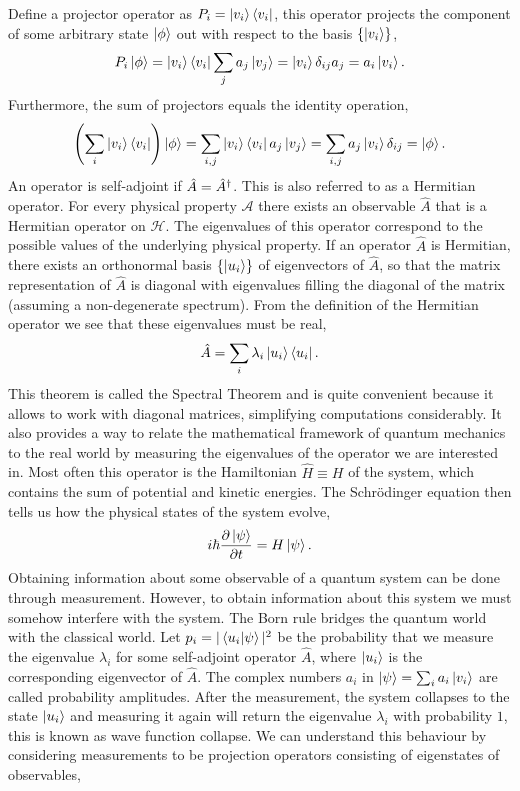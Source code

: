 \noindent Define a projector operator as $P_i = \ket{v_i}\bra{v_i}$, this operator projects the component of some arbitrary state $\ket{\phi}$ out with respect to the basis $\{\ket{v_i}\}$,
\begin{equation*}
    P_i \ket{\phi} = \ket{v_i}\bra{v_i} \sum_j a_j\ket{v_j} = \ket{v_i} \delta_{ij} a_j = a_i \ket{v_i}.
\end{equation*}
Furthermore, the sum of projectors equals the identity operation,
\begin{equation*}
    \left(\sum_i \ket{v_i}\bra{v_i}\right)\ket{\phi} = \sum_{i,j} \ket{v_i}\bra{v_i} a_j \ket{v_j} = \sum_{i,j} a_j \ket{v_i} \delta_{ij} = \ket{\phi} .
\end{equation*}
An operator is self-adjoint if $\Hat{A} = \Hat{A}^\dagger$. This is also referred to as a Hermitian operator. For every physical property $\mathcal{A}$ there exists an observable $\hat{A}$ that is a Hermitian operator on $\mathcal{H}$. The eigenvalues of this operator correspond to the possible values of the underlying physical property. If an operator $\hat{A}$ is Hermitian, there exists an orthonormal basis $\{\ket{u_i}\}$ of eigenvectors of $\hat{A}$, so that the matrix representation of $\hat{A}$ is diagonal with eigenvalues filling the diagonal of the matrix (assuming a non-degenerate spectrum). From the definition of the Hermitian operator we see that these eigenvalues must be real,
\begin{equation}
    \hat{A} = \sum_i \lambda_i \ket{u_i}\bra{u_i} \label{eq:observable}.
\end{equation}
This theorem is called the Spectral Theorem and is quite convenient because it allows to work with diagonal matrices, simplifying computations considerably. It also provides a way to relate the mathematical framework of quantum mechanics to the real world by measuring the eigenvalues of the operator we are interested in. Most often this operator is the Hamiltonian $\hat{H}\equiv H$ of the system, which contains the sum of potential and kinetic energies. The Schr\"odinger equation then tells us how the physical states of the system evolve,
\begin{equation*}
    i \hbar \frac{\partial \ket{\psi}}{\partial t} = H  \ket{\psi}.
\end{equation*}
Obtaining information about some observable of a quantum system can be done through measurement. However, to obtain information about this system we must somehow interfere with the system. The Born rule bridges the quantum world with the classical world. Let $p_i = |\braket{u_i}{\psi}|^2$ be the probability that we measure the eigenvalue $\lambda_i$ for some self-adjoint operator $\hat{A}$, where $\ket{u_i}$ is the corresponding eigenvector of $\hat{A}$. The complex numbers $a_i$ in $\ket{\psi}=\sum_i a_i \ket{v_i}$ are called probability amplitudes. After the measurement, the system collapses to the state $\ket{u_i}$ and measuring it again will return the eigenvalue $\lambda_i$ with probability $1$, this is known as wave function collapse. We can understand this behaviour by considering measurements to be projection operators consisting of eigenstates of observables,
